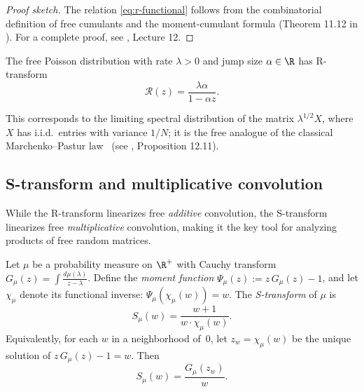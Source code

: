 \begin{proof}[Proof sketch]
The relation \eqref{eq:r-functional} follows from the combinatorial definition of free cumulants and the moment-cumulant formula (Theorem 11.12 in \cite{nica2006lectures}). For a complete proof, see \cite{nica2006lectures}, Lecture 12.
\end{proof}

\begin{example}\label{ex:free-poisson}
The free Poisson distribution with rate $\lambda > 0$ and jump size $\alpha \in \R$ has R-transform
\begin{equation}
\mathcal{R}(z) = \frac{\lambda \alpha}{1 - \alpha z}.
\end{equation}

This corresponds to the limiting spectral distribution of the matrix $\lambda^{1/2} X$, where $X$ has i.i.d.\ entries with variance $1/N$; it is the free analogue of the classical Marchenko--Pastur law~\cite{marchenko1967distribution} (see \cite{nica2006lectures}, Proposition 12.11).
\end{example}

\subsection{S-transform and multiplicative convolution}

While the R-transform linearizes free \emph{additive} convolution, the S-transform linearizes free \emph{multiplicative} convolution, making it the key tool for analyzing products of free random matrices.

\begin{definition}[S-transform]\label{def:s-transform}
Let $\mu$ be a probability measure on $\R^+$ with Cauchy transform $G_\mu(z) = \int \frac{d\mu(\lambda)}{z - \lambda}$. Define the \emph{moment function} $\Psi_\mu(z) := z\,G_\mu(z) - 1$, and let $\chi_\mu$ denote its functional inverse: $\Psi_\mu(\chi_\mu(w)) = w$. The \emph{S-transform} of $\mu$ is
\begin{equation}\label{eq:s-transform-def}
S_\mu(w) = \frac{w+1}{w \cdot \chi_\mu(w)}.
\end{equation}
Equivalently, for each $w$ in a neighborhood of~$0$, let $z_w = \chi_\mu(w)$ be the unique solution of $z\,G_\mu(z) - 1 = w$. Then
\begin{equation}\label{eq:s-transform-via-G}
S_\mu(w) = \frac{G_\mu(z_w)}{w}.
\end{equation}
\end{definition}


